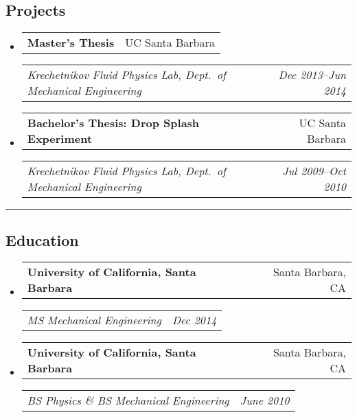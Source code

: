 \documentclass[10pt,letterpaper]{article}
\makeatletter
\newcommand{\headerrow}[2]{
\begin{tabular*}{\linewidth}{l@{\extracolsep{\fill}}r}
		#1 &
		#2 \\
	\end{tabular*}
}
\newcommand{\jobitem}[4]{\item \headerrow{\textbf{#1}}{#2}
\headerrow{\emph{#3}}{\emph{#4}}}
\makeatother
\begin{document}
\subsection*{Projects}
\begin{itemize}
	\jobitem{Master's Thesis}{UC Santa Barbara}
		    {Krechetnikov Fluid Physics Lab, Dept.~of Mechanical Engineering}{Dec 2013--Jun 2014}
	
	\jobitem{Bachelor's Thesis: Drop Splash Experiment}{UC Santa Barbara}
		    {Krechetnikov Fluid Physics Lab, Dept.~of Mechanical Engineering}{Jul 2009--Oct 2010}
	
\end{itemize}

\hrule
\subsection*{Education}
\begin{itemize}
	\jobitem{University of California, Santa Barbara}{Santa Barbara, CA}
		    {MS  Mechanical Engineering}{Dec 2014}
	\jobitem{University of California, Santa Barbara}{Santa Barbara, CA}	
		    {BS Physics \&  BS Mechanical Engineering}{June 2010}
\end{itemize}
\end{document}

